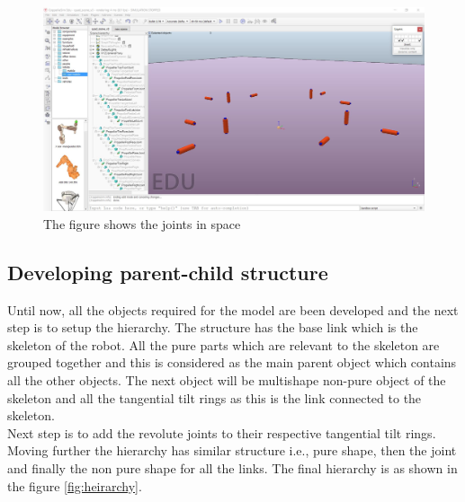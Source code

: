 \documentclass[a4paper, 12pt, oneside]{book}
\begin{document}
\begin{figure}[H]
    \begin{center}
        \includegraphics[width=.95\linewidth]{figures/joints.JPG}
        \caption{The figure shows the joints in space}
        \label{fig:joints}
    \end{center}
\end{figure}

\subsection{Developing parent-child structure}
Until now, all the objects required for the model are been developed and the next step is to setup the hierarchy. The structure has the base link which is the skeleton of the robot. All the pure parts which are relevant to the skeleton are grouped together and this is considered as the main parent object which contains all the other objects. The next object will be multishape non-pure object of the skeleton and all the tangential tilt rings as this is the link connected to the skeleton. \\

Next step is to add the revolute joints to their respective tangential tilt rings. Moving further the hierarchy has similar structure i.e., pure shape, then the joint and finally the non pure shape for all the links. The final hierarchy is as shown in the figure \ref{fig:heirarchy}.    
\end{document}
